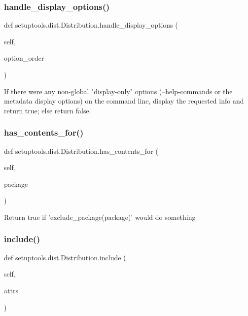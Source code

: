 \subsubsection{\texorpdfstring{handle\+\_\+display\+\_\+options()}{handle\_display\_options()}}
{\footnotesize\ttfamily def setuptools.\+dist.\+Distribution.\+handle\+\_\+display\+\_\+options (\begin{DoxyParamCaption}\item[{}]{self,  }\item[{}]{option\+\_\+order }\end{DoxyParamCaption})}

\begin{DoxyVerb}If there were any non-global "display-only" options
(--help-commands or the metadata display options) on the command
line, display the requested info and return true; else return
false.
\end{DoxyVerb}
 \mbox{\label{classsetuptools_1_1dist_1_1Distribution_a0d99480ae4beb9ec35a2c99a46721af6}} 
\subsubsection{\texorpdfstring{has\+\_\+contents\+\_\+for()}{has\_contents\_for()}}
{\footnotesize\ttfamily def setuptools.\+dist.\+Distribution.\+has\+\_\+contents\+\_\+for (\begin{DoxyParamCaption}\item[{}]{self,  }\item[{}]{package }\end{DoxyParamCaption})}

\begin{DoxyVerb}Return true if 'exclude_package(package)' would do something\end{DoxyVerb}
 \mbox{\label{classsetuptools_1_1dist_1_1Distribution_a2306d43f883208c7a145e26056ee4fc9}} 
\subsubsection{\texorpdfstring{include()}{include()}}
{\footnotesize\ttfamily def setuptools.\+dist.\+Distribution.\+include (\begin{DoxyParamCaption}\item[{}]{self,  }\item[{}]{attrs }\end{DoxyParamCaption})}

